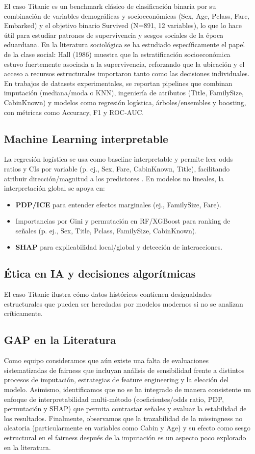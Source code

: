\documentclass[sjournal]{IEEEtran}
\begin{document}
El caso Titanic es un benchmark clásico de clasificación binaria por su combinación de variables demográficas y socioeconómicas (Sex, Age, Pclass, Fare, Embarked) y el objetivo binario Survived (N=891, 12 variables), lo que lo hace útil para estudiar patrones de supervivencia y sesgos sociales de la época eduardiana. En la literatura sociológica se ha estudiado específicamente el papel de la clase social: Hall (1986) muestra que la estratificación socioeconómica estuvo fuertemente asociada a la supervivencia, reforzando que la ubicación y el acceso a recursos estructurales importaron tanto como las decisiones individuales. En trabajos de datasets experimentales, se reportan pipelines que combinan imputación (mediana/moda o KNN), ingeniería de atributos (Title, FamilySize, CabinKnown) y modelos como regresión logística, árboles/ensembles y boosting, con métricas como Accuracy, F1 y ROC-AUC.
\subsection{Machine Learning interpretable
}

La regresión logística se usa como baseline interpretable y permite leer odds ratios y CIs por variable (p. ej., Sex, Fare, CabinKnown, Title), facilitando atribuir dirección/magnitud a los predictores . En modelos no lineales, la interpretación global se apoya en:
\begin{itemize}
    \item \textbf{PDP/ICE }para entender efectos marginales (ej., FamilySize, Fare).
    \item Importancias por Gini y permutación en RF/XGBoost para ranking de señales (p. ej., Sex, Title, Pclass, FamilySize, CabinKnown).
    \item \textbf{SHAP} para explicabilidad local/global y detección de interacciones.
\end{itemize}

\subsection{ Ética en IA y decisiones algorítmicas
}
El caso Titanic ilustra cómo datos históricos contienen desigualdades estructurales que pueden ser heredadas por modelos modernos si no se analizan críticamente.

\subsection{ GAP en la Literatura
}
Como equipo consideramos que aún existe una falta de evaluaciones sistematizadas de fairness que incluyan análisis de sensibilidad frente a distintos procesos de imputación, estrategias de feature engineering y la elección del modelo. Asimismo, identificamos que no se ha integrado de manera consistente un enfoque de interpretabilidad multi-método (coeficientes/odds ratio, PDP, permutación y SHAP) que permita contrastar señales y evaluar la estabilidad de los resultados. Finalmente, observamos que la trazabilidad de la missingness no aleatoria (particularmente en variables como Cabin y Age) y su efecto como sesgo estructural en el fairness después de la imputación es un aspecto poco explorado en la literatura.
\end{document}
